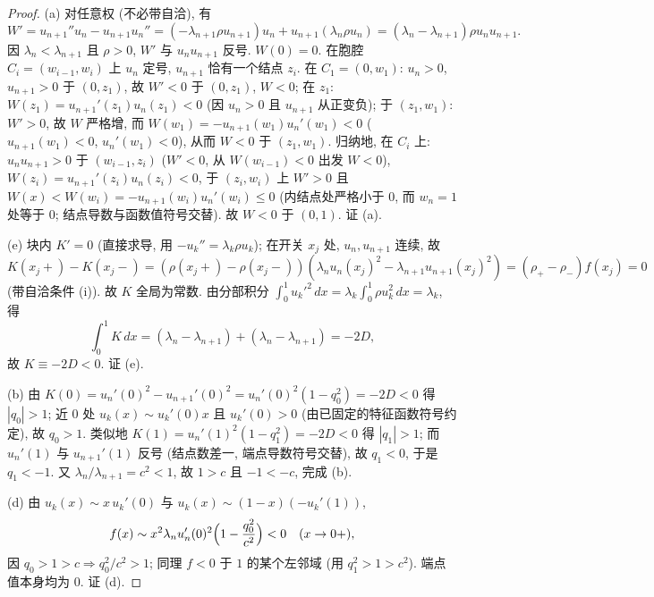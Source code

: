 \documentclass[UTF8]{ctexart}
\begin{document}
\begin{proof}
(a) 对任意权 (不必带自洽), 有
\begin{equation*}
	W'=u_{n+1}''u_n-u_{n+1}u_n''=(-\lambda_{n+1}\rho u_{n+1})u_n
	+u_{n+1}(\lambda_n\rho u_n)=(\lambda_n-\lambda_{n+1})\rho u_nu_{n+1}.
\end{equation*}
因 $\lambda_n<\lambda_{n+1}$ 且 $\rho>0$, $W'$ 与 $u_nu_{n+1}$ 反号.
$W(0)=0$. 在胞腔 $C_i=(w_{i-1},w_i)$ 上 $u_n$ 定号, $u_{n+1}$ 恰有一个结点 $z_i$.
在 $C_1=(0,w_1)$: $u_n>0$, $u_{n+1}>0$ 于 $(0,z_1)$, 故 $W'<0$ 于 $(0,z_1)$,
$W<0$; 在 $z_1$: $W(z_1)=u_{n+1}'(z_1)u_n(z_1)<0$ (因 $u_n>0$ 且 $u_{n+1}$ 从正变负);
于 $(z_1,w_1)$: $W'>0$, 故 $W$ 严格增, 而
$W(w_1)=-u_{n+1}(w_1)u_n'(w_1)<0$ ($u_{n+1}(w_1)<0$, $u_n'(w_1)<0$), 从而
$W<0$ 于 $(z_1,w_1)$. 归纳地, 在 $C_i$ 上: $u_nu_{n+1}>0$ 于 $(w_{i-1},z_i)$
($W'<0$, 从 $W(w_{i-1})<0$ 出发 $W<0$), $W(z_i)=u_{n+1}'(z_i)u_n(z_i)<0$,
于 $(z_i,w_i)$ 上 $W'>0$ 且 $W(x)<W(w_i)=-u_{n+1}(w_i)u_n'(w_i)\le0$
(内结点处严格小于 $0$, 而 $w_n=1$ 处等于 $0$; 结点导数与函数值符号交替).
故 $W<0$ 于 $(0,1)$.
证 (a).

(e) 块内 $K'=0$ (直接求导, 用 $-u_k''=\lambda_k\rho u_k$); 在开关 $x_j$ 处,
$u_n,u_{n+1}$ 连续, 故
\begin{equation*}
	K(x_j+)-K(x_j-)=(\rho(x_j+)-\rho(x_j-))(\lambda_nu_n(x_j)^2-\lambda_{n+1}u_{n+1}(x_j)^2)
	=(\rho_+-\rho_-)f(x_j)=0
\end{equation*}
(带自洽条件 (i)). 故 $K$ 全局为常数. 由分部积分
$\int_0^1 u_k'^2\,dx=\lambda_k\int_0^1\rho u_k^2\,dx=\lambda_k$, 得
\begin{equation*}
	\int_0^1 K\,dx=(\lambda_n-\lambda_{n+1})+(\lambda_n-\lambda_{n+1})=-2D,
\end{equation*}
故 $K\equiv-2D<0$. 证 (e).

(b) 由 $K(0)=u_n'(0)^2-u_{n+1}'(0)^2=u_n'(0)^2(1-q_0^2)=-2D<0$ 得
$|q_0|>1$; 近 $0$ 处 $u_k(x)\sim u_k'(0)x$ 且 $u_k'(0)>0$ (由已固定的特征函数符号约定),
故 $q_0>1$. 类似地 $K(1)=u_n'(1)^2(1-q_1^2)=-2D<0$ 得 $|q_1|>1$; 而
$u_n'(1)$ 与 $u_{n+1}'(1)$ 反号 (结点数差一, 端点导数符号交替), 故 $q_1<0$,
于是 $q_1<-1$. 又 $\lambda_n/\lambda_{n+1}=c^2<1$, 故 $1>c$ 且 $-1<-c$,
完成 (b).

(d) 由 $u_k(x)\sim x\,u_k'(0)$ 与 $u_k(x)\sim(1-x)(-u_k'(1))$,
\begin{equation*}
	f(x)\sim x^2\lambda_nu_n'(0)^2\Bigl(1-\frac{q_0^2}{c^2}\Bigr)<0
	\quad(x\to0+),
\end{equation*}
因 $q_0>1>c\Rightarrow q_0^2/c^2>1$; 同理 $f<0$ 于 $1$ 的某个左邻域 (用 $q_1^2>1>c^2$).
端点值本身均为 $0$. 证 (d).


\end{proof}
\end{document}
